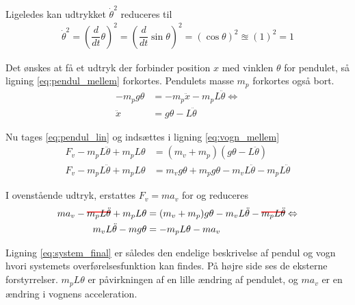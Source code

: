Ligeledes kan udtrykket $\dot{\theta}^2$ reduceres til
\begin{align}
\dot{\theta}^2 = \left( \dfrac{d}{dt}\theta \right)^2 =  \left( \dfrac{d}{dt}\sin{\theta} \right)^2 = \left(\cos{\theta}\right)^2 \approxeq (1)^2 = 1
\end{align}

Det ønskes at få et udtryk der forbinder position $x$ med vinklen $\theta$ for pendulet, så ligning \ref{eq:pendul_mellem} forkortes. Pendulets masse $m_p$ forkortes også bort. 
\begin{align}
-m_pg\theta &= -m_p\ddot{x}-m_p L \ddot{\theta} \Leftrightarrow\\
\ddot{x} &= g \theta -L \ddot{\theta} \label{eq:pendul_lin}
\end{align}

Nu tages \ref{eq:pendul_lin} og indsættes i ligning \ref{eq:vogn_mellem}
\begin{align}
F_v - m_p L\ddot{\theta} + m_p L\theta &= (m_v + m_p)(g \theta -L \ddot{\theta})  \\
F_v  - m_p L\ddot{\theta} + m_p L\theta &= m_v g \theta +  m_p g \theta - m_v L \ddot{\theta} - m_p L \ddot{\theta}
\end{align}

I ovenstående udtryk, erstattes $F_v = ma_v$ for og reduceres
\begin{align}
m a_v - \hcancel[red]{ m_p L\ddot{\theta}} + m_p L\theta &= (m_v + m_p) g \theta - m_v L \ddot{\theta} - \hcancel[red]{ m_p L\ddot{\theta}} \Leftrightarrow \\
m_v L \ddot{\theta} - m g \theta &= - m_p L\theta -m a_v \label{eq:system_final}
\end{align} 

Ligning \ref{eq:system_final} er således den endelige beskrivelse af pendul og vogn hvori systemets overførelsesfunktion kan findes.
På højre side ses de eksterne forstyrrelser. 
$m_pL\theta $ er påvirkningen af en lille ændring af pendulet, og $m a_v$ er en ændring i vognens acceleration.